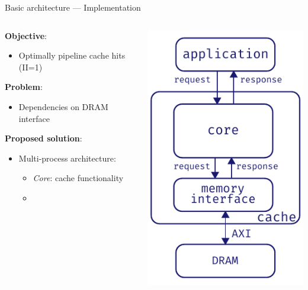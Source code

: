 \documentclass[aspectratio=169]{beamer}
\begin{document}
\begin{frame}{Basic architecture --- Implementation}
	\begin{columns}[c]
		\begin{column}{.55\textwidth}
			\vfill
			\textbf{Objective}:
			\begin{itemize}
				\item Optimally pipeline cache hits (II=1)
			\end{itemize}

			\bigskip
			\textbf{Problem}:
			\begin{itemize}
				\item Dependencies on DRAM interface
			\end{itemize}

			\bigskip
			\textbf{Proposed solution}:
			\begin{itemize}
				\item Multi-process architecture:
					\begin{itemize}
						\item \emph{Core}: cache functionality
						\item {}
					\end{itemize}
			\end{itemize}
		\end{column}
		\begin{column}{.5\textwidth}
			\begin{center}
			\includegraphics[height=.7\textheight]{multi_proc_basic_arch}
			\end{center}
		\end{column}
	\end{columns}
\end{frame}
\end{document}
